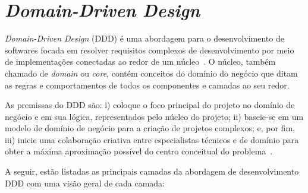 \section{\textit{Domain-Driven Design}}\label{2-fundamentacao-ddd}

\textit{Domain-Driven Design} (DDD) é uma abordagem para o desenvolvimento de softwares focada em resolver requisitos complexos de desenvolvimento por meio de implementações conectadas ao redor de um núcleo~\cite{EVANS-2004-DDD}. O núcleo, também chamado de \textit{domain} ou \textit{core}, contém conceitos do domínio do negócio que ditam as regras e comportamentos de todos os componentes e camadas ao seu redor.

As premissas do DDD são: i) coloque o foco principal do projeto no domínio de negócio e em sua lógica, representados pelo núcleo do projeto; ii) baseie-se em um modelo de domínio de negócio para a criação de projetos complexos; e, por fim, iii) inicie uma colaboração criativa entre especialistas técnicos e de domínio para obter a máxima aproximação possível do centro conceitual do problema~\cite{DDDCOMMUNITY-2019-DDD}.



A seguir, estão listadas as principais camadas da abordagem de desenvolvimento DDD com uma visão geral de cada camada: 

